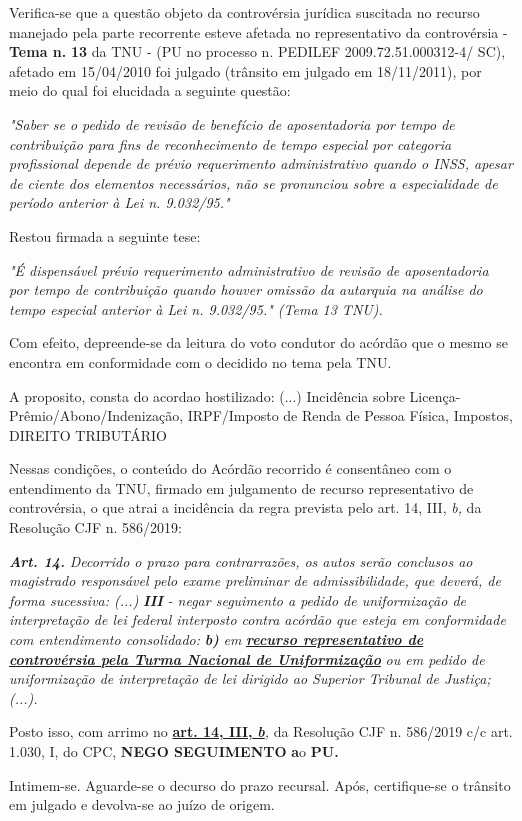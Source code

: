 \documentclass[12pt]{article}
\begin{document}
\justifying
\noindent Verifica-se que a questão objeto da controvérsia jurídica suscitada no recurso manejado pela parte recorrente esteve afetada no representativo da controvérsia - \textbf{Tema n. }\textbf{13} da TNU - (PU no processo n. PEDILEF 2009.72.51.000312-4/ SC),  afetado em 15/04/2010 foi julgado (trânsito em julgado em 18/11/2011), por meio do qual foi elucidada a seguinte questão:

\noindent \textit{"Saber se o pedido de revisão de benefício de aposentadoria por tempo de contribuição para fins de reconhecimento de tempo especial por categoria profissional depende de prévio requerimento administrativo quando o INSS, apesar de ciente dos elementos necessários, não se pronunciou sobre a especialidade de período anterior à Lei n. 9.032/95."}

\noindent Restou firmada a seguinte tese:

\noindent \textit{"É dispensável prévio requerimento administrativo de revisão de aposentadoria por tempo de contribuição quando houver omissão da autarquia na análise do tempo especial anterior à Lei n. 9.032/95." (Tema 13 TNU).}

\noindent Com efeito, depreende-se da leitura do voto condutor do acórdão que o mesmo se encontra em conformidade com o decidido no  tema pela TNU.

\noindent A proposito, consta do acordao hostilizado: (...) Incidência sobre Licença-Prêmio/Abono/Indenização, IRPF/Imposto de Renda de Pessoa Física, Impostos, DIREITO TRIBUTÁRIO

\noindent Nessas condições, o conteúdo do Acórdão recorrido é consentâneo com o entendimento da TNU, firmado em julgamento de recurso representativo de controvérsia, o que atrai a incidência da regra prevista pelo art. 14, III, \textit{b,} da Resolução CJF n. 586/2019:

\noindent \textit{\textbf{Art. 14.}}\textit{ Decorrido o prazo para contrarrazões, os autos serão conclusos ao magistrado responsável pelo exame preliminar de admissibilidade, que deverá, de forma sucessiva: (...) }\textit{\textbf{III }}\textit{- negar seguimento a pedido de uniformização de interpretação de lei federal interposto contra acórdão que esteja em conformidade com entendimento consolidado: }\textit{\textbf{b)}}\textit{ em }\uline{\textit{\textbf{recurso representativo de controvérsia pela Turma Nacional de Uniformização}}}\textit{ ou em pedido de uniformização de interpretação de lei dirigido ao Superior Tribunal de Justiça;(...).}

\noindent Posto isso, com arrimo no \uline{\textbf{art. 14, III, }}\uline{\textit{\textbf{b}}}\textit{,} da Resolução CJF n. 586/2019 c/c art. 1.030, I, do CPC, \textbf{NEGO SEGUIMENTO }\textbf{a}o\textbf{ PU}\textbf{.}

\noindent Intimem-se. Aguarde-se o decurso do prazo recursal. Após, certifique-se o trânsito em julgado e devolva-se ao juízo de origem.
\end{document}
